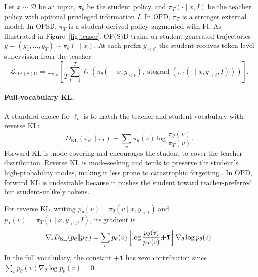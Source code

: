 Let $x\sim\mathcal D$ be an input, $\pi_\theta$ be the student policy, and
$\pi_T(\cdot\mid x,I)$ be the teacher policy with optional privileged information
$I$. In OPD, $\pi_T$ is a stronger external model. In OPSD, $\pi_T$ is a
student-derived policy augmented with PI.  As illustrated in Figure~\ref{fig:teaser}, OP(S)D trains on student-generated trajectories
$y=(y_1,\ldots,y_T)\sim\pi_\theta(\cdot\mid x)$. At each prefix $y_{<t}$, the
student receives token-level supervision from the teacher:
\begin{equation}
\mathcal L_{\mathrm{OP(S)D}}
=
\mathbb E_{x,y}
\left[
\frac{1}{T}\sum_{t=1}^T
\ell_t\!\left(
\pi_\theta(\cdot\mid x,y_{<t}),
\operatorname{stograd}\!\left(\pi_T(\cdot\mid x,y_{<t},I)\right)
\right)
\right].
\end{equation}

\paragraph{Full-vocabulary KL.}
A standard choice for $\ell_t$ is to match the teacher and student vocabulary with reverse KL:
\begin{equation}
D_{\mathrm{KL}}(\pi_\theta\|\pi_T)
=
\sum_v \pi_\theta(v)\log\frac{\pi_\theta(v)}{\pi_T(v)} .
\label{eq:fullreverseKL}
\end{equation}
Forward KL is mode-covering and encourages the student to cover the teacher
distribution. Reverse KL is mode-seeking and tends to preserve the student's
high-probability modes, making it less prone to catastrophic forgetting \cite{chan2022greedificationoperatorspolicyoptimization}. In OPD, forward KL is undesirable because it pushes the student toward teacher-preferred but student-unlikely tokens. 

For reverse KL, writing $p_\theta(v)=\pi_\theta(v\mid x,y_{<t})$
and $p_T(v)=\pi_T(v\mid x,y_{<t},I)$, its gradient is
\begin{equation}
\nabla_\theta D_{\mathrm{KL}}(p_\theta\|p_T)
=
\sum_v p_\theta(v)
\left[
\log\frac{p_\theta(v)}{p_T(v)} \cancel{\textbf{+1}}
\right]
\nabla_\theta \log p_\theta(v).
\end{equation}
In the full vocabulary, the constant $\textbf{+1}$ has zero contribution since
$
\sum_v p_\theta(v)\nabla_\theta\log p_\theta(v) = 0 .
$


